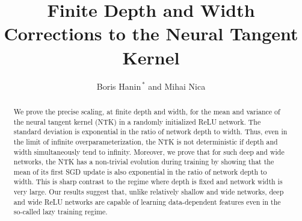 \documentclass[11pt, reqno]{amsart}
\title[NTK at Finite Depth and Width]{Finite Depth and Width Corrections to the Neural Tangent Kernel}
\author[Boris Hanin and Mihai Nica]{Boris Hanin$^{\,*}$ and Mihai Nica}
\begin{document}
\maketitle
\begin{abstract}
     We prove the precise scaling, at finite depth and width, for the mean and variance of the neural tangent kernel (NTK) in a randomly initialized ReLU network. The standard deviation is exponential in the ratio of network depth to width. Thus, even in the limit of infinite overparameterization, the NTK is not deterministic if depth and width simultaneously tend to infinity. Moreover, we prove that for such deep and wide networks, the NTK has a non-trivial evolution during training by showing that the mean of its first SGD update is also exponential in the ratio of network depth to width. This is sharp contrast to the regime where depth is fixed and network width is very large. Our results suggest that, unlike relatively shallow and wide networks, deep and wide ReLU networks are capable of learning data-dependent features even in the so-called lazy training regime. 
\end{abstract}
\end{document}
